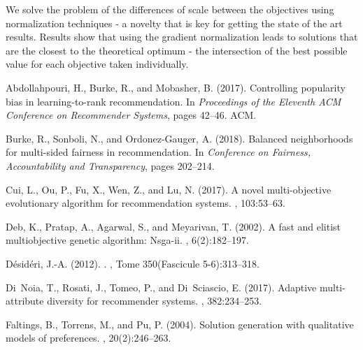 \documentclass[letterpaper]{article}
\begin{document}
We solve the problem of the differences of scale between the objectives using normalization techniques - a novelty that is key for getting the state of the art results. Results show that using the gradient normalization leads to solutions that are the closest to the theoretical optimum - the intersection of the best possible value for each objective taken individually.

\begin{thebibliography}{}

Abdollahpouri, H., Burke, R., and Mobasher, B. (2017).
\newblock Controlling popularity bias in learning-to-rank recommendation.
\newblock In {\em Proceedings of the Eleventh ACM Conference on Recommender
  Systems}, pages 42--46. ACM.

Burke, R., Sonboli, N., and Ordonez-Gauger, A. (2018).
\newblock Balanced neighborhoods for multi-sided fairness in recommendation.
\newblock In {\em Conference on Fairness, Accountability and Transparency},
  pages 202--214.

Cui, L., Ou, P., Fu, X., Wen, Z., and Lu, N. (2017).
\newblock A novel multi-objective evolutionary algorithm for recommendation
  systems.
, 103:53--63.

Deb, K., Pratap, A., Agarwal, S., and Meyarivan, T. (2002).
\newblock A fast and elitist multiobjective genetic algorithm: Nsga-ii.
, 6(2):182--197.

D{\'e}sid{\'e}ri, J.-A. (2012).
.
, Tome 350(Fascicule
  5-6):313--318.

Di~Noia, T., Rosati, J., Tomeo, P., and Di~Sciascio, E. (2017).
\newblock Adaptive multi-attribute diversity for recommender systems.
, 382:234--253.

Faltings, B., Torrens, M., and Pu, P. (2004).
\newblock Solution generation with qualitative models of preferences.
, 20(2):246--263.


\end{thebibliography}
\end{document}
